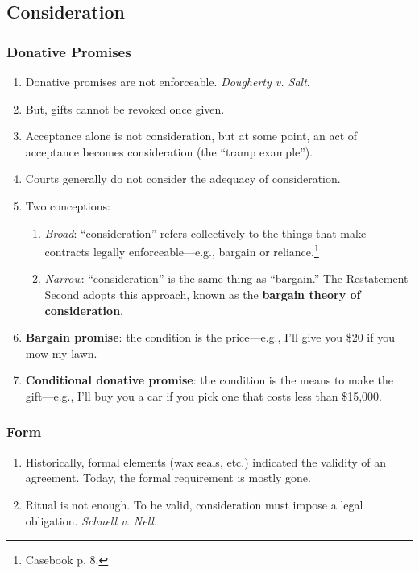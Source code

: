 \subsection{Consideration}

\subsubsection{Donative Promises}

\begin{enumerate}
    \item Donative promises are not enforceable. \emph{Dougherty v. Salt}.
    \item But, gifts cannot be revoked once given.
    \item Acceptance alone is not consideration, but at some point, an act of 
    acceptance becomes consideration (the ``tramp example'').
    \item Courts generally do not consider the adequacy of consideration.
    \item Two conceptions:
    \begin{enumerate}
        \item \emph{Broad}: ``consideration'' refers collectively to the 
        things that make contracts legally enforceable---e.g., bargain or 
        reliance.\footnote{Casebook p. 8.}
        \item \emph{Narrow}: ``consideration'' is the same thing as 
        ``bargain.'' The Restatement Second adopts this approach, known as the 
        \textbf{bargain theory of consideration}.
    \end{enumerate}
    \item \textbf{Bargain promise}: the condition is the price---e.g., I'll 
    give you \$20 if you mow my lawn.
    \item \textbf{Conditional donative promise}: the condition is the means 
    to make the gift---e.g., I'll buy you a car if you pick one that costs 
    less than \$15,000.
\end{enumerate}

\subsubsection{Form}

\begin{enumerate}
    \item Historically, formal elements (wax seals, etc.) indicated the 
    validity of an agreement. Today, the formal requirement is mostly gone.
    \item Ritual is not enough. To be valid, consideration must impose a legal 
    obligation. \emph{Schnell v. Nell}.
\end{enumerate}

